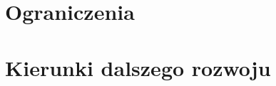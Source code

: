 \section{Ograniczenia}\label{sec:ograniczenia}

%
%
%
%
%
%

\section{Kierunki dalszego rozwoju}\label{sec:dalsze-prace}

%
%
%
%
%
%
%

